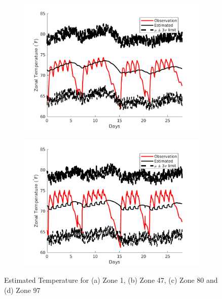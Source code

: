 \begin{figure}[H]
\begin{subfigure}{0.45\textwidth}
\includegraphics[width=\textwidth]{jbs_figures/zone_3}
\caption{}
\label{zone_3}
\end{subfigure}
\centering
\begin{subfigure}{0.45\textwidth}
\includegraphics[width=\textwidth]{jbs_figures/zone_4}
\caption{}
\label{zone_4}
\end{subfigure}
\caption{Estimated Temperature for (a) Zone 1, (b) Zone 47, (c) Zone 80 and (d) Zone 97}
\label{fig:Zone_temperature}
\end{figure}




